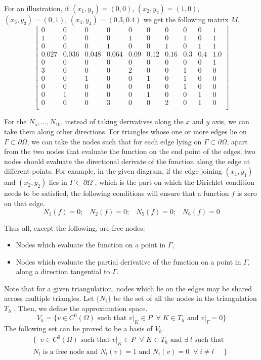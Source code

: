 \documentclass[12pt]{article}
\begin{document}
	For an illustration, if $(x_1,y_1)=(0,0)$, $(x_2,y_2)=(1,0)$, $(x_3,y_3)=(0,1)$, $(x_4,y_4)=(0.3,0.4)$ we get the following matrix $M$.
	$$
	\begin{bmatrix}
	0 & 0 & 0 & 0 & 0 & 0 & 0 & 0 & 0 & 1 \\
	1 & 0 & 0 & 0 & 1 & 0 & 0 & 1 & 0 & 1 \\
	0 & 0 & 0 & 1 & 0 & 0 & 1 & 0 & 1 & 1 \\
	0.027 & 0.036 & 0.048 & 0.064 & 0.09 & 0.12 & 0.16 & 0.3 & 0.4 & 1.0 \\
	0 & 0 & 0 & 0 & 0 & 0 & 0 & 0 & 0 & 1 \\
	3 & 0 & 0 & 0 & 2 & 0 & 0 & 1 & 0 & 0  \\
	0 & 0 & 1 & 0 & 0 & 1 & 0 & 1 & 0 & 0  \\
	0 & 0 & 0 & 0 & 0 & 0 & 0 & 1 & 0 & 0  \\
	0 & 1 & 0 & 0 & 0 & 1 & 0 & 0 & 1 & 0  \\
	0 & 0 & 0 & 3 & 0 & 0 & 2 & 0 & 1 & 0  \\
	\end{bmatrix}
	$$
	
	
	For the $N_5,...,N_{10}$, instead of taking derivatives along the $x$ and $y$ axis, we can take them along other directions. For triangles whose one or more edges lie on $\Gamma \subset \partial \Omega$, we can take the nodes such that for each edge lying on $\Gamma \subset \partial \Omega$, apart from the two nodes that evaluate the function on the end point of the edges, two nodes should evaluate the directional derivate of the function along the edge at different points.
	For example, in the given diagram, if the edge joining $(x_1,y_1)$ and $(x_2,y_2)$ lies in $\Gamma \subset \partial \Omega$ , which is the part on which the Dirichlet condition needs to be satisfied, the following conditions will ensure that a function $f$ is zero on that edge.
	$$N_1(f)=0;\;\;\;N_2(f)=0;\;\;\;N_5(f)=0;\;\;\;N_6(f)=0$$
	
	Thus all, except the following, are free nodes:
	\begin{itemize}
  \item Nodes which evaluate the function on a point in $\Gamma$,
  \item Nodes which evaluate the partial derivative of the function on a point in $\Gamma$, along a direction tangential to $\Gamma$.
	\end{itemize}
  Note that for a given triangulation, nodes which lie on the edges may be shared across multiple triangles. Let $\{N_i\}$ be the set of all the nodes in the triangulation $T_h$ . Then, we define the approximation space. $$V_h=\{v \in C^0(\Omega) \mbox{ such that }\left.v\right|_K \in P\;\;\forall\;K\in T_h\mbox{ and }\left.v\right|_{\Gamma}=0\}$$
  The following set can be proved to be a basis of $V_h$.
  \begin{equation*}
	\begin{split}
  \{ \;\;v\in  C^0(\Omega) \mbox{ such that }\left.v\right|_K \in P\;\;\forall\;K\in T_h\mbox{ and }  \exists\; l  \mbox{ such that }\;\; \\ N_l\mbox{ is a free node and } N_l(v)=1 \mbox{ and }N_i(v)=0 \;\;\forall\;i\neq l \;\;\;\;\;\}
  \end{split}
  \end{equation*}
\end{document}
